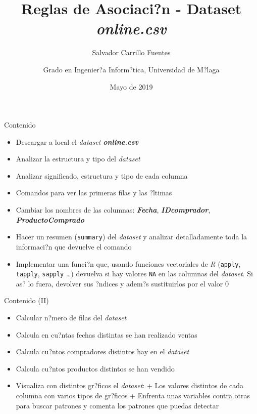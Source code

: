 \documentclass[
  ignorenonframetext,
]{beamer}
\title{Reglas de Asociaci?n - Dataset \emph{online.csv}}
\author{Salvador Carrillo Fuentes \and Grado en Ingenier?a Inform?tica, Universidad de M?laga}
\date{Mayo de 2019}
\providecommand{\tightlist}{%
  \setlength{\itemsep}{0pt}\setlength{\parskip}{0pt}}
\begin{document}
\frame{\titlepage}

\begin{frame}[fragile]{Contenido}
\protect\hypertarget{contenido}{}

\begin{itemize}
\tightlist
\item
  Descargar a local el \emph{dataset} \textbf{\emph{online.csv}}
\item
  Analizar la estructura y tipo del \emph{dataset}
\item
  Analizar significado, estructura y tipo de cada columna
\item
  Comandos para ver las primeras filas y las ?ltimas
\item
  Cambiar los nombres de las columnas: \textbf{\emph{Fecha}},
  \textbf{\emph{IDcomprador}}, \textbf{\emph{ProductoComprado}}
\item
  Hacer un resumen (\texttt{summary}) del \emph{dataset} y analizar
  detalladamente toda la informaci?n que devuelve el comando
\item
  Implementar una funci?n que, usando funciones vectoriales de \emph{R}
  (\texttt{apply}, \texttt{tapply}, \texttt{sapply} \ldots) devuelva si
  hay valores \texttt{NA} en las columnas del \emph{dataset}. Si as? lo
  fuera, devolver sus ?ndices y adem?s sustituirlos por el valor \(0\)
\end{itemize}

\end{frame}

\begin{frame}{Contenido (II)}
\protect\hypertarget{contenido-ii}{}

\begin{itemize}
\tightlist
\item
  Calcular n?mero de filas del \emph{dataset}
\item
  Calcula en cu?ntas fechas distintas se han realizado ventas
\item
  Calcula cu?ntos compradores distintos hay en el \emph{dataset}
\item
  Calcula cu?ntos productos distintos se han vendido
\item
  Visualiza con distintos gr?ficos el \emph{dataset}: + Los valores
  distintos de cada columna con varios tipos de gr?ficos + Enfrenta unas
  variables contra otras para buscar patrones y comenta los patrones que
  puedas detectar
\end{itemize}

\end{frame}
\end{document}

